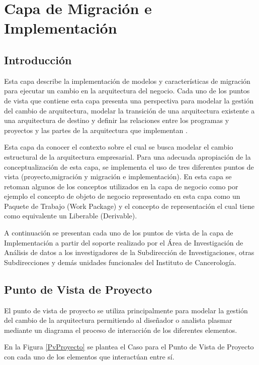 \chapter{Capa de Migración e Implementación}
\section{Introducción}
Esta capa describe la implementación de modelos y características de migración para   ejecutar un cambio en la arquitectura del negocio. Cada uno de los puntos de vista que contiene esta capa presenta una perspectiva  para modelar la gestión del cambio de arquitectura, modelar la transición de una arquitectura existente a una arquitectura de destino y definir las relaciones entre los programas y proyectos y las partes de la arquitectura que implementan \cite{ArchiMate3.0.1}. 

Esta capa da conocer el contexto sobre el cual se busca modelar el cambio estructural de la arquitectura empresarial. Para una adecuada apropiación de la conceptualización de esta capa, se implementa el uso de tres diferentes puntos de vista (proyecto,migración y migración e implementación). En esta capa se retoman algunos de los conceptos utilizados en la capa de negocio como por ejemplo el concepto de objeto de negocio representado en esta capa como un Paquete de Trabajo
(Work Package) y el concepto de representación el cual tiene como
equivalente un Liberable (Derivable)\cite{BolanosCastro2019}.


A continuación se presentan cada uno de los puntos de vista de la capa de Implementación a partir del soporte realizado por el Área de Investigación de Análisis de datos a los investigadores de la Subdirección de Investigaciones, otras Subdirecciones y demás unidades funcionales del Instituto de Cancerología.

\newpage
\section{Punto de Vista de Proyecto}
El punto de vista de proyecto se utiliza principalmente para modelar la gestión del cambio de la arquitectura permitiendo al diseñador o analista plasmar mediante un diagrama el proceso de interacción de los diferentes elementos\cite{BolanosCastro2019}. 

En la Figura \ref{PvProyecto} se plantea el Caso para el Punto de Vista de Proyecto con cada uno de los elementos que interactúan entre sí. 

